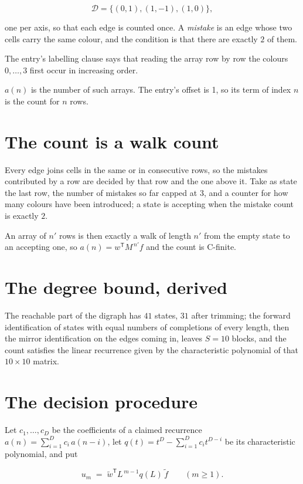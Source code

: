 \documentclass[11pt]{article}
\theoremstyle{definition}
\begin{document}
\[\mathcal{D} = \{(0,1), (1,-1), (1,0)\},\]

one per axis, so that each edge is counted once. A {\itshape mistake} is an edge whose two cells carry the same colour, and the condition is that there are exactly $2$ of them.

The entry's labelling clause says that reading the array row by row the colours $0,\dots,3$ first occur in increasing order.

$a(n)$ is the number of such arrays. The entry's offset is 1, so its term of index $n$ is the count for $n$ rows.

\section{The count is a walk count}

Every edge joins cells in the same or in consecutive rows, so the mistakes contributed by a row are decided by that row and the one above it. Take as state the last row, the number of mistakes so far capped at $3$, and a counter for how many colours have been introduced; a state is accepting when the mistake count is exactly $2$.

An array of $n'$ rows is then exactly a walk of length $n'$ from the empty state to an accepting one, so $a(n) = w^{\mathsf T}M^{\,n'}f$ and the count is C-finite.

\section{The degree bound, derived}

The reachable part of the digraph has $41$ states, $31$ after trimming; the forward identification of states with equal numbers of completions of every length, then the mirror identification on the edges coming in, leaves $S = 10$ blocks, and the count satisfies the linear recurrence given by the characteristic polynomial of that $10\times10$ matrix.

\section{The decision procedure}

Let $c_1,\dots,c_D$ be the coefficients of a claimed recurrence $a(n) = \sum_{i=1}^{D} c_i\,a(n-i)$, let $q(t) = t^{D} - \sum_{i=1}^{D} c_i t^{D-i}$ be its characteristic polynomial, and put

\[u_m \;=\; \tilde w^{\mathsf T} L^{\,m-1} q(L)\,\tilde f \qquad (m \ge 1).\]
\end{document}
